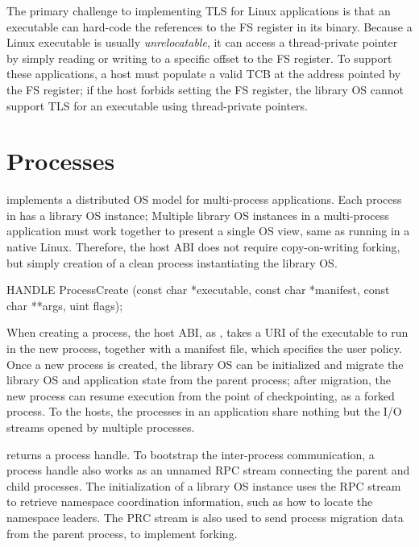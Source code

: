 The primary challenge
to implementing TLS for Linux applications
is that an executable can hard-code the references to the FS register in its binary.
Because a Linux executable is usually {\em unrelocatable},
it can access a thread-private pointer by simply reading or writing to a specific offset
to the FS register.
To support these applications,
a host must populate a valid TCB at the address pointed by the FS register;
if the host forbids setting the FS register,
the library OS cannot support TLS for an executable using thread-private pointers.




\section{Processes}
\label{sec:abi:proc}


\graphene{} implements a distributed OS model for multi-process applications.
Each process in \graphene{} has a library OS instance;
Multiple library OS instances in a multi-process application must work together
to present a single OS view,
same as running in a native Linux.
Therefore, the host ABI does not require copy-on-writing forking,
but simply creation of a clean process instantiating the library OS.




\begin{paldef}
HANDLE ProcessCreate (const char *executable,
                      const char *manifest,
                      const char **args, uint flags);
\end{paldef}

When creating a process, the host ABI, as , takes a URI of the executable to run in the new process,
together with a manifest file, which specifies the user policy.
Once a new process is created, the library OS can be initialized
and migrate the library OS and application state from the parent process;
after migration, the new process can resume execution from the point of checkpointing,
as a forked process.
To the hosts, the processes in an application share nothing
but the I/O streams opened by multiple processes.


 returns a process handle.
To bootstrap the inter-process communication, a process handle also works as an unnamed RPC stream connecting the parent and child processes.
The initialization of a library OS instance uses the RPC stream
to retrieve namespace coordination information, such as how to locate the namespace leaders.
The PRC stream is also used to send process migration data
from the parent process, to implement forking.






